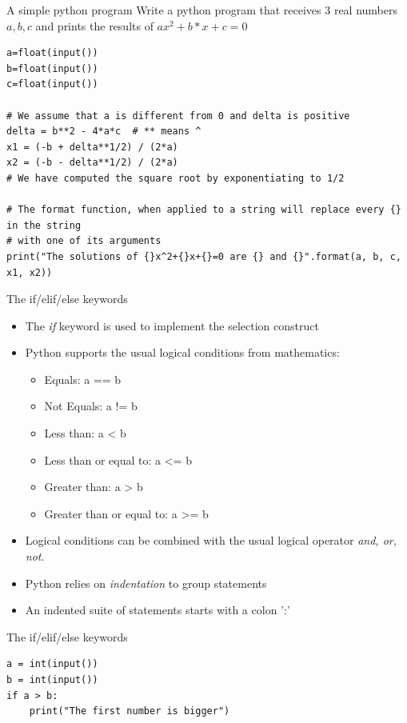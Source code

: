 \documentclass[aspectratio=169,]{beamer}
\begin{document}
\begin{frame}[fragile]{A simple python program}
    Write a python program that receives 3 real numbers $a, b, c$ and prints the results of $ax^2 + b*x + c = 0$
    \pause
    \begin{verbatim}
a=float(input())
b=float(input())
c=float(input())

# We assume that a is different from 0 and delta is positive
delta = b**2 - 4*a*c  # ** means ^
x1 = (-b + delta**1/2) / (2*a)
x2 = (-b - delta**1/2) / (2*a)
# We have computed the square root by exponentiating to 1/2

# The format function, when applied to a string will replace every {} in the string
# with one of its arguments
print("The solutions of {}x^2+{}x+{}=0 are {} and {}".format(a, b, c, x1, x2))
    \end{verbatim}
\end{frame}

\begin{frame}{The if/elif/else keywords}
    \begin{itemize}
        \item The \emph{if} keyword is used to implement the selection construct
        \item Python supports the usual logical conditions from mathematics:
            \begin{itemize}
                \item Equals: a == b
                \item Not Equals: a != b
                \item Less than: a < b
                \item Less than or equal to: a <= b
                \item Greater than: a > b
                \item Greater than or equal to: a >= b
            \end{itemize}
        \item Logical conditions can be combined with the usual logical operator \emph{and, or, not}.
        \item Python relies on \emph{indentation} to group statements
        \item An indented suite of statements starts with a colon ':'
    \end{itemize}
\end{frame}

\begin{frame}[fragile]{The if/elif/else keywords}
    \begin{verbatim}
a = int(input())
b = int(input())
if a > b:
    print("The first number is bigger")
    \end{verbatim}
\end{frame}
\end{document}
